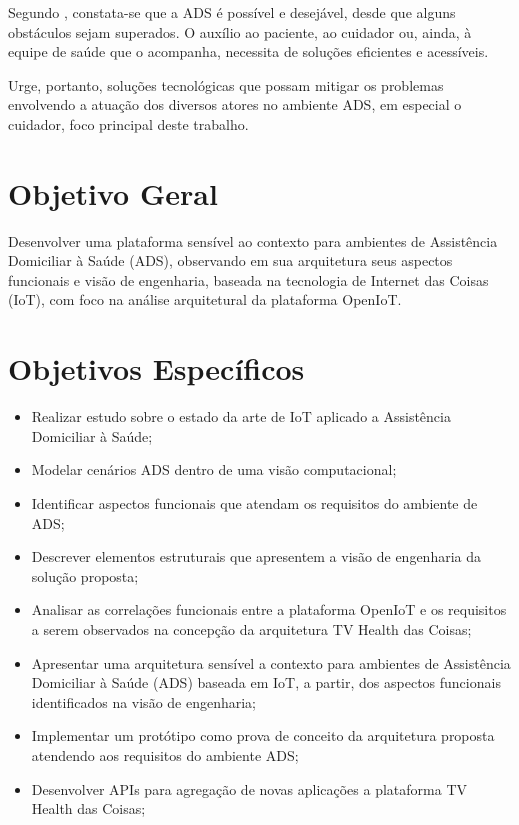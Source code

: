 Segundo , constata-se que a ADS é possível e desejável,
desde que alguns obstáculos sejam superados.  O auxílio ao paciente, ao
cuidador ou, ainda, à equipe de saúde que o acompanha, necessita de soluções
eficientes e acessíveis.

Urge, portanto, soluções tecnológicas que possam mitigar os problemas envolvendo
a atuação dos diversos atores no ambiente ADS, em especial o cuidador,
foco principal deste trabalho.

\section{Objetivo Geral}\label{sec:objetivos}

Desenvolver uma plataforma sensível ao contexto para ambientes de Assistência
Domiciliar à Saúde (ADS), observando em sua arquitetura seus aspectos
funcionais e visão de engenharia, baseada na tecnologia de Internet das Coisas
(IoT), com foco na análise arquitetural da plataforma OpenIoT.

\section{Objetivos Específicos}

\begin{itemize}
  \item Realizar estudo sobre o estado da arte de IoT aplicado a Assistência
    Domiciliar à Saúde;
  \item Modelar cenários ADS dentro de uma visão computacional;
  \item Identificar aspectos funcionais que atendam os requisitos do ambiente
    de ADS;
  \item Descrever elementos estruturais que apresentem a visão de engenharia da
    solução proposta;
  \item Analisar as correlações funcionais entre a plataforma OpenIoT e os
    requisitos a serem observados na concepção da arquitetura TV Health das
    Coisas;
  \item Apresentar uma arquitetura sensível a contexto para ambientes de
    Assistência Domiciliar à Saúde (ADS) baseada em IoT, a partir, dos aspectos
    funcionais identificados na visão de engenharia;
  \item Implementar um protótipo como prova de conceito da arquitetura proposta
    atendendo aos requisitos do ambiente ADS;
  \item Desenvolver APIs para agregação de novas aplicações a plataforma TV
    Health das Coisas;
\end{itemize}

